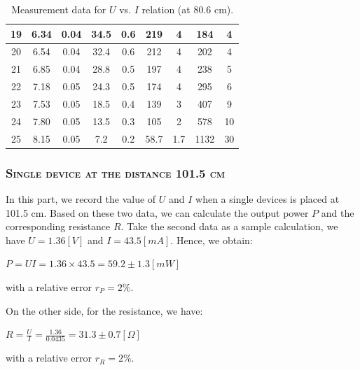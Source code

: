 \documentclass[a4paper,12pt]{article}
\begin{document}
\begin{table}[H]
\begin{center}
\begin{tabular}{|c|c|c|c|c|c|c|c|c|}
    19    & 6.34  & 0.04  & 34.5  & 0.6   & 219   & 4     & 184   & 4  \\ \hline
    20    & 6.54  & 0.04  & 32.4  & 0.6   & 212   & 4     & 202   & 4  \\ \hline
    21    & 6.85  & 0.04  & 28.8  & 0.5   & 197   & 4     & 238   & 5  \\ \hline
    22    & 7.18  & 0.05  & 24.3  & 0.5   & 174   & 4     & 295   & 6  \\ \hline
    23    & 7.53  & 0.05  & 18.5  & 0.4   & 139   & 3     & 407   & 9  \\ \hline
    24    & 7.80  & 0.05  & 13.5  & 0.3   & 105   & 2     & 578   & 10  \\ \hline
    25    & 8.15  & 0.05  & 7.2   & 0.2   & 58.7  & 1.7   & 1132  & 30  \\ \hline
\end{tabular}
\caption{Measurement data for $U$ vs. $I$ relation (at 80.6 cm).}
\end{center}
\end{table}


\subsubsection{\textsc{Single device at the distance 101.5 cm}}
In this part, we record the value of $U$ and $I$ when a single devices is placed at 101.5 cm. Based on these two data, we can calculate the output power $P$ and the corresponding resistance $R$. Take the second data as a sample calculation, we have $U = 1.36 [V]$ and $I = 43.5 [mA]$. Hence, we obtain:
\begin{center}
$ P = UI = 1.36 \times 43.5 = 59.2 \pm 1.3 [mW] $
\end{center}
with a relative error $r_P = 2\%$.
\par On the other side, for the resistance, we have:
\begin{center}
$ \displaystyle R = \frac{U}{I} = \frac{1.36}{0.0435} = 31.3 \pm 0.7 [\Omega] $
\end{center}
with a relative error $r_R = 2\%$.
\end{document}

